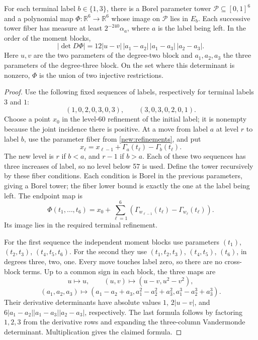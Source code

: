 \documentclass[11pt]{article}
\theoremstyle{definition}
\newcommand{\R}{\mathbb R}
\begin{document}
\begin{lemma}\label{new:flows}
For each terminal label $b\in\{1,3\}$, there is a Borel parameter tower
$\mathcal P\subseteq[0,1]^6$ and a polynomial map $\Phi:\R^6\to\R^6$ whose image on
$\mathcal P$ lies in $E_b$. Each successive tower fiber has measure at least
$2^{-240}\alpha_a$, where $a$ is the label being left. In the order of the moment blocks,
\[
 |\det D\Phi|=12|u-v|\,|a_1-a_2|\,|a_1-a_3|\,|a_2-a_3|.
\]
Here $u,v$ are the two parameters of the degree-two block and $a_1,a_2,a_3$ the three
parameters of the degree-three block. On the set where this determinant is nonzero,
$\Phi$ is the union of two injective restrictions.
\end{lemma}
\begin{proof}
Use the following fixed sequences of labels, respectively for terminal labels $3$ and $1$:
\[
 (1,0,2,0,3,0,3),\qquad (3,0,3,0,2,0,1).
\]
Choose a point $x_0$ in the level-60 refinement of the initial label; it is nonempty because
the joint incidence there is positive. At a move from label $a$ at level $r$ to label $b$,
use the parameter fiber from \cref{new:refinements}, and put
\[
 x_{\ell}=x_{\ell-1}+\Gamma_a(t_\ell)-\Gamma_b(t_\ell).
\]
The new level is $r$ if $b<a$, and $r-1$ if $b>a$. Each of these two sequences has three
increases of label, so no level below 57 is used. Define the tower recursively by these
fiber conditions. Each condition is Borel in the previous parameters, giving a Borel tower;
the fiber lower bound is exactly the one at the label being left. The endpoint map is
\[
 \Phi(t_1,\ldots,t_6)=x_0+\sum_{\ell=1}^6
       (\Gamma_{w_{\ell-1}}(t_\ell)-\Gamma_{w_\ell}(t_\ell)).
\]
Its image lies in the required terminal refinement.

For the first sequence the independent moment blocks use parameters
$(t_1)$, $(t_2,t_3)$, $(t_4,t_5,t_6)$. For the second they use
$(t_1,t_2,t_3)$, $(t_4,t_5)$, $(t_6)$, in degrees three, two, one.
Every move touches label zero, so there are no cross-block terms. Up to a common sign in
each block, the three maps are
\[
 u\longmapsto u,\qquad
 (u,v)\longmapsto(u-v,u^2-v^2),
\]
\[
 (a_1,a_2,a_3)\longmapsto
 (a_1-a_2+a_3,a_1^2-a_2^2+a_3^2,a_1^3-a_2^3+a_3^3).
\]
Their derivative determinants have absolute values $1$, $2|u-v|$, and
$6|a_1-a_2||a_1-a_3||a_2-a_3|$, respectively. The last formula follows by factoring
$1,2,3$ from the derivative rows and expanding the three-column Vandermonde determinant.
Multiplication gives the claimed formula.


\end{proof}
\end{document}

